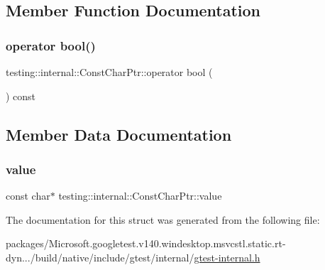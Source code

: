\subsection{Member Function Documentation}
\mbox{\label{structtesting_1_1internal_1_1_const_char_ptr_a85c8174b5d4db8fe96863509ba767b27}} 
\subsubsection{\texorpdfstring{operator bool()}{operator bool()}}
{\footnotesize\ttfamily testing\+::internal\+::\+Const\+Char\+Ptr\+::operator bool (\begin{DoxyParamCaption}{ }\end{DoxyParamCaption}) const\hspace{0.3cm}{\ttfamily [inline]}}



\subsection{Member Data Documentation}
\mbox{\label{structtesting_1_1internal_1_1_const_char_ptr_adba40d23d5986904b605946f643cf26e}} 
\subsubsection{\texorpdfstring{value}{value}}
{\footnotesize\ttfamily const char$\ast$ testing\+::internal\+::\+Const\+Char\+Ptr\+::value}



The documentation for this struct was generated from the following file\+:\begin{DoxyCompactItemize}
\item 
packages/\+Microsoft.\+googletest.\+v140.\+windesktop.\+msvcstl.\+static.\+rt-\/dyn.../build/native/include/gtest/internal/\mbox{\hyperlink{gtest-internal_8h}{gtest-\/internal.\+h}}\end{DoxyCompactItemize}
